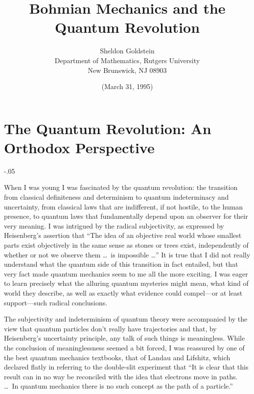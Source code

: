 
\textwidth 15cm
\textheight 22cm
\topmargin -10mm
\newcommand\bq{\begin{quotation}}
\newcommand\eq{\end{quotation}}
\newcommand\sig{\bf\sigma}

\title{Bohmian Mechanics and the Quantum Revolution}

\author{Sheldon Goldstein\\
Department of Mathematics, Rutgers University\\ New Brunswick, NJ
08903}
\date{(March 31, 1995)}
\maketitle

\section*{The Quantum Revolution: An Orthodox Perspective}
\openup-.05\jot

When I was young I was fascinated by the quantum revolution: the transition
{}from classical definiteness and determinism to quantum indeterminacy and
uncertainty, from classical laws that are indifferent, if not hostile, to
the human presence, to quantum laws that fundamentally depend upon an
observer for their very meaning. I was intrigued by the radical
subjectivity, as expressed by Heisenberg's assertion \cite{Heisenberg} that
``The idea of an objective real world whose smallest parts exist
objectively in the same sense as stones or trees exist, independently of
whether or not we observe them \dots\  is impossible \dots''  It is true that I
did not really understand what the quantum side of this transition in fact
entailed, but that very fact made quantum mechanics seem to me all the more
exciting. I was eager to learn precisely what the alluring quantum
mysteries might mean, what kind of world they describe, as well as exactly
what evidence could compel---or at least support---such radical
conclusions.

The subjectivity and indeterminism of quantum theory were accompanied by
the view that quantum particles don't really have trajectories and that, by
Heisenberg's uncertainty principle, any talk of such things is meaningless.
While the conclusion of meaninglessness seemed a bit forced, I was
reassured by one of the best quantum mechanics textbooks, that of Landau
and Lifshitz, which declared flatly in referring to the double-slit
experiment that \cite{LL} ``It is clear that this result can in no way be
reconciled with the idea that electrons move in paths. \dots\ In quantum
mechanics there is no such concept as the path of a particle.''

